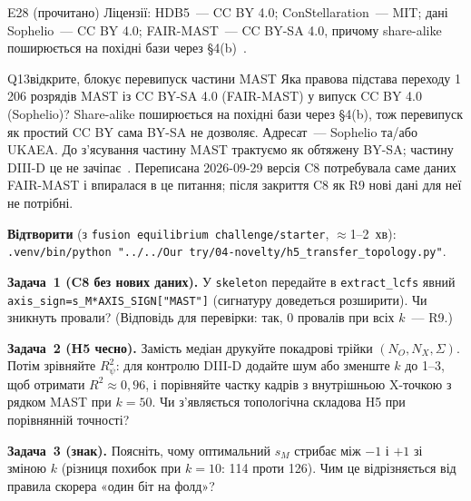 \begin{established}{E28 (прочитано)}
Ліцензії: HDB5~--- CC BY 4.0; ConStellaration~--- MIT; дані Sophelio~--- CC BY 4.0; FAIR-MAST~--- CC BY-SA 4.0, причому share-alike поширюється на похідні бази через §4(b)~\cite{RegEst,RegVerif}.
\end{established}

\begin{itemcard}{Q13}{відкрите, блокує перевипуск частини MAST}
Яка правова підстава переходу 1\,206 розрядів MAST із CC BY-SA 4.0 (FAIR-MAST) у випуск CC BY 4.0 (Sophelio)? Share-alike поширюється на похідні бази через §4(b), тож перевипуск як простий CC BY сама BY-SA не дозволяє. Адресат~--- Sophelio та/або UKAEA. До з'ясування частину MAST трактуємо як обтяжену BY-SA; частину DIII-D це не зачіпає~\cite{RegQ,RegVerif}. Переписана 2026-09-29 версія C8 потребувала саме даних FAIR-MAST і впиралася в це питання; після закриття C8 як R9 нові дані для неї не потрібні.
\end{itemcard}

\begin{practicum}
\textbf{Відтворити} (з \texttt{fusion equilibrium challenge/starter}, $\approx$1--2~хв): \texttt{.venv/bin/python "../../Our try/04-novelty/h5\_transfer\_topology.py"}.

\textbf{Задача~1 (C8 без нових даних).} У \texttt{skeleton} передайте в \texttt{extract\_lcfs} явний \texttt{axis\_sign=s\_M*AXIS\_SIGN["MAST"]} (сигнатуру доведеться розширити). Чи зникнуть провали? (Відповідь для перевірки: так, 0 провалів при всіх $k$~--- R9.)

\textbf{Задача~2 (H5 чесно).} Замість медіан друкуйте покадрові трійки $(N_O,N_X,\Sigma)$. Потім зрівняйте $R^2_\psi$: для контролю DIII-D додайте шум або зменште $k$ до 1--3, щоб отримати $R^2\approx0{,}96$, і порівняйте частку кадрів з внутрішньою X-точкою з рядком MAST при $k=50$. Чи з'являється топологічна складова H5 при порівнянній точності?

\textbf{Задача~3 (знак).} Поясніть, чому оптимальний $s_M$ стрибає між $-1$ і $+1$ зі зміною $k$ (різниця похибок при $k=10$: 114 проти 126). Чим це відрізняється від правила скорера «один біт на фолд»?
\end{practicum}
